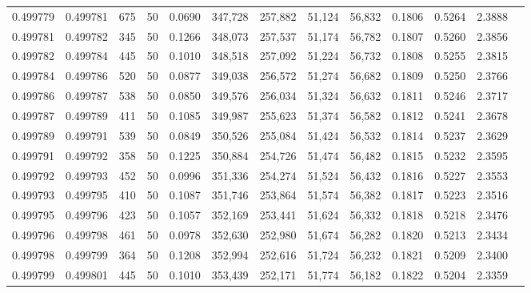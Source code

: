 \begin{tabular}{rrrrrrrrrrrrr}
0.499779 & 0.499781 & 675 &  50 &                                     0.0690 & 347,728 & 257,882 &  51,124 &  56,832 & 0.1806 & 0.5264 & 2.3888 \\
0.499781 & 0.499782 & 345 &  50 &                                     0.1266 & 348,073 & 257,537 &  51,174 &  56,782 & 0.1807 & 0.5260 & 2.3856 \\
0.499782 & 0.499784 & 445 &  50 &                                     0.1010 & 348,518 & 257,092 &  51,224 &  56,732 & 0.1808 & 0.5255 & 2.3815 \\
0.499784 & 0.499786 & 520 &  50 &                                     0.0877 & 349,038 & 256,572 &  51,274 &  56,682 & 0.1809 & 0.5250 & 2.3766 \\
0.499786 & 0.499787 & 538 &  50 &                                     0.0850 & 349,576 & 256,034 &  51,324 &  56,632 & 0.1811 & 0.5246 & 2.3717 \\
0.499787 & 0.499789 & 411 &  50 &                                     0.1085 & 349,987 & 255,623 &  51,374 &  56,582 & 0.1812 & 0.5241 & 2.3678 \\
0.499789 & 0.499791 & 539 &  50 &                                     0.0849 & 350,526 & 255,084 &  51,424 &  56,532 & 0.1814 & 0.5237 & 2.3629 \\
0.499791 & 0.499792 & 358 &  50 &                                     0.1225 & 350,884 & 254,726 &  51,474 &  56,482 & 0.1815 & 0.5232 & 2.3595 \\
0.499792 & 0.499793 & 452 &  50 &                                     0.0996 & 351,336 & 254,274 &  51,524 &  56,432 & 0.1816 & 0.5227 & 2.3553 \\
0.499793 & 0.499795 & 410 &  50 &                                     0.1087 & 351,746 & 253,864 &  51,574 &  56,382 & 0.1817 & 0.5223 & 2.3516 \\
0.499795 & 0.499796 & 423 &  50 &                                     0.1057 & 352,169 & 253,441 &  51,624 &  56,332 & 0.1818 & 0.5218 & 2.3476 \\
0.499796 & 0.499798 & 461 &  50 &                                     0.0978 & 352,630 & 252,980 &  51,674 &  56,282 & 0.1820 & 0.5213 & 2.3434 \\
0.499798 & 0.499799 & 364 &  50 &                                     0.1208 & 352,994 & 252,616 &  51,724 &  56,232 & 0.1821 & 0.5209 & 2.3400 \\
0.499799 & 0.499801 & 445 &  50 &                                     0.1010 & 353,439 & 252,171 &  51,774 &  56,182 & 0.1822 & 0.5204 & 2.3359 \\

\end{tabular}
